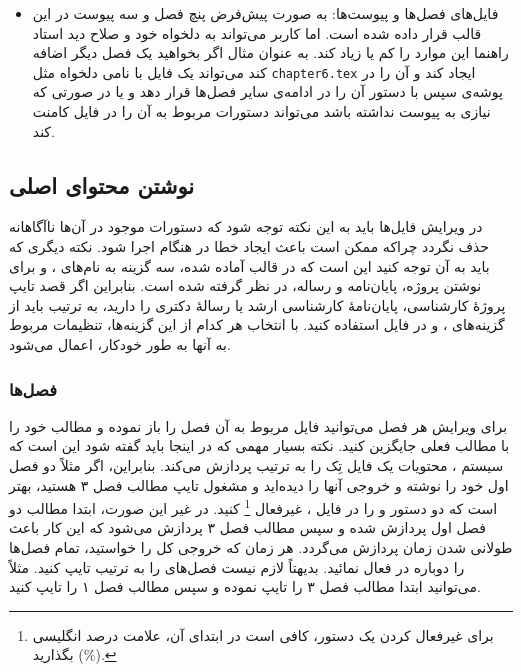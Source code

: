 \begin{itemize}
	\item
	 فایل‌های فصل‌ها و پیوست‌ها: به صورت پیش‌فرض پنچ
	 فصل و سه پیوست در این قالب قرار داده شده است.
	 اما کاربر می‌تواند به دلخواه خود و صلاح دید استاد
	 راهنما این موارد را کم یا زیاد کند. به عنوان 
	 مثال اگر بخواهید یک فصل دیگر اضافه کند می‌تواند
	 یک فایل با نامی دلخواه مثل
	 \verb*|chapter6.tex|
	 ایجاد کند و آن را در پوشه‌ی 
	 سپس با دستور
	 \verb*||
	آن را در ادامه‌‌ی سایر فصل‌ها قرار دهد و یا در صورتی
	که نیازی به پیوست نداشته باشد می‌تواند دستورات مربوط
	به آن را در فایل 
	کامنت کند.
\end{itemize}
	\subsection[مطالب پایان‌نامه را چطور بنویسم؟]
	{نوشتن محتوای اصلی}
در ویرایش فایل‌ها باید به این نکته توجه شود که دستورات موجود در آن‌ها ناآگاهانه حذف نگردد چراکه ممکن است باعث ایجاد خطا در هنگام اجرا شود.
نکته دیگری که باید به آن توجه کنید این است که در قالب آماده شده، سه گزینه به نام‌های
،
و
برای نوشتن پروژه، پایان‌نامه و رساله، در نظر گرفته شده است. بنابراین اگر قصد تایپ پروژهٔ کارشناسی، پایان‌نامهٔ کارشناسی ارشد یا رسالهٔ دکتری را دارید، به ترتیب باید از گزینه‌های
،
و
در فایل 
استفاده کنید. با انتخاب هر کدام از این گزینه‌ها، تنظیمات مربوط به آنها به طور خودکار، اعمال می‌شود.
	\subsubsection{فصل‌ها}

برای ویرایش هر فصل می‌توانید فایل مربوط به آن فصل را باز نموده و مطالب خود را با مطالب فعلی جایگزین کنید. نکته بسیار مهمی که در اینجا باید گفته شود این است که سیستم \lr{\TeX}، محتویات یک فایل تِک را به ترتیب پردازش می‌کند.  بنابراین، اگر مثلاً  دو فصل اول خود را نوشته و خروجی آنها را دیده‌اید و مشغول تایپ مطالب فصل ۳ هستید، بهتر است
	که دو دستور 
	\verb!!
	و
	\verb!!
	را در فایل 
	،
	غیرفعال%
	\footnote{
		برای غیرفعال کردن یک دستور، کافی است در ابتدای آن، علامت درصد انگلیسی (\%) بگذارید.
	}
	کنید. در غیر این صورت، ابتدا مطالب دو فصل اول پردازش شده و سپس مطالب فصل ۳ پردازش می‌شود که این کار باعث طولانی شدن زمان پردازش می‌گردد. هر زمان که خروجی کل \پ را خواستید، تمام فصل‌ها را دوباره در
	فعال نمائید.
	بدیهتاً لازم نیست فصل‌های \پ را به ترتیب تایپ کنید. مثلاً می‌توانید ابتدا مطالب فصل ۳ را تایپ نموده و سپس مطالب فصل ۱ را تایپ کنید. 
	
